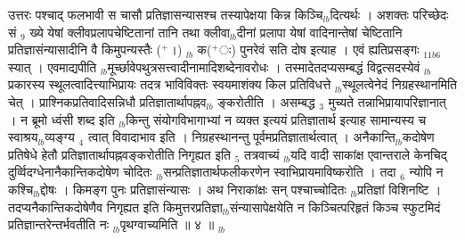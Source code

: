 \documentclass[article,12pt,a4paper]{memoir}%
\newcommand{\add}[1]{($^{+}$#1)}
\newcounter{parCount}
\begin{document}
	  
	  \pstart \leavevmode%
	उत्तरः पश्चाद् फलभावी स चासौ प्रतिज्ञासन्यासश्च तस्यापेक्षया किन्न किञ्चि{\tiny $_{lb}$}दित्यर्थः । अशक्तः परिच्छेदः सं {\tiny $_{9}$} \leavevmode{} ख्ये येषां क्लीवप्रलापचेष्टितानां तानि तथा क्लीवा{\tiny $_{lb}$}दीनां प्रलापा येषां वादिनान्तेषां चेष्टितानि प्रतिज्ञासंन्यासादीनि वै किमुपन्यस्तैः \add{।} {\tiny $_{lb}$} क\add{ः} पुनरेवं सति दोष इत्याह । {\color{DodgerBlue3}एवं ह्यतिप्रसङ्गः} {\tiny $_{11b6}$} स्यात् । एवमाद्यपीति {\tiny $_{lb}$}मूर्च्छावेपथुत्रसत्त्वादीनामादिशब्देनावरोधः । तस्मादेतदप्यसम्बद्धं विद्वत्सदस्येवं {\tiny $_{lb}$}प्रकारस्य स्थूलत्वादित्त्याभिप्रायः तदत्र {\color{DodgerBlue3}भाविविक्तः} स्वयमाशंक्य किल प्रतिविधत्ते {\tiny $_{lb}$}स्थूलत्वेनेदं निग्रहस्थानमिति चेत् । प्राश्निकप्रतिवादिसन्निधौ प्रतिज्ञातार्थापह्नव{\tiny $_{lb}$}\leavevmode{} ङ्करोतीति । असम्बद्ध {\tiny $_{3}$} मुच्यते तन्नाभिप्रायापरिज्ञानात् । न ब्रूमो ध्वंसी शब्द इति {\tiny $_{lb}$}किन्तु संयोगविभागाभ्यां न व्यक्त इत्ययं प्रतिज्ञातार्थ इत्याह सामान्यस्य च स्वाश्रय{\tiny $_{lb}$}व्यङ्ग्य {\tiny $_{4}$} त्वात् विवादाभाव इति । निग्रहस्थानन्तु पूर्वमप्रतिज्ञातार्थत्वात् । अनैकान्ति{\tiny $_{lb}$}कदोषेण प्रतिषेधे हेतौ प्रतिज्ञातार्थापह्नवङ्करोतीति निगृह्यत इति {\tiny $_{5}$} तत्रवाच्यं {\tiny $_{lb}$}यदि वादी साकांक्ष एवान्तराले केनचिद् दुर्व्विदग्धेनानैकान्तिकदोषेण चोदितः {\tiny $_{lb}$}सन्प्रतिज्ञातार्थफलीकरणेन स्वाभिप्रायमाविष्करोति । तदा {\tiny $_{6}$} न्योपि न कश्चि{\tiny $_{lb}$}द्दोषः । किमङ्ग पुनः प्रतिज्ञासंन्यासः । अथ निराकांक्षः सन् पश्चाच्चोदितः {\tiny $_{lb}$}प्रतिज्ञां विशिनष्टि । तदप्यनैकान्तिकदोषेणैव निगृह्यत इति किमुत्तरप्रतिज्ञा{\tiny $_{lb}$}संन्यासापेक्षयेति न किञ्चित्परिहृतं किञ्च स्फुटमिदं प्रतिज्ञान्तरेन्तर्भवतीति नः {\tiny $_{lb}$}पृथग्वाच्यमिति ॥ ४ ॥
	{}
	\pend%
      {\tiny $_{lb}$}
\end{document}
